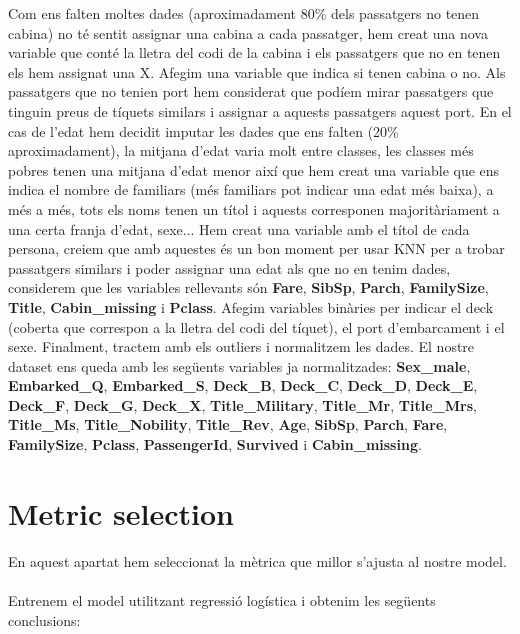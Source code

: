 \documentclass[9pt,a4paper,twoside]{tau-class/tau}
\begin{document}
Com ens falten moltes dades (aproximadament 80\% dels passatgers no tenen cabina) no té sentit assignar una cabina a cada passatger, hem creat una nova variable que conté la lletra del codi de la cabina i els passatgers que no en tenen els hem assignat una X. Afegim una variable que indica si tenen cabina o no.
Als passatgers que no tenien port hem considerat que podíem mirar passatgers que tinguin preus de tíquets similars i assignar a aquests passatgers aquest port.
En el cas de l'edat hem decidit imputar les dades que ens falten (20\% aproximadament), la mitjana d'edat varia molt entre classes, les classes més pobres tenen una mitjana d'edat menor així que hem creat una variable que ens indica el nombre de familiars (més familiars pot indicar una edat més baixa), a més a més, tots els noms tenen un títol i aquests corresponen majoritàriament a una certa franja d'edat, sexe...
Hem creat una variable amb el títol de cada persona, creiem que amb aquestes és un bon moment per usar KNN per a trobar passatgers similars i poder assignar una edat als que no en tenim dades, considerem que les variables rellevants són \textbf{Fare}, \textbf{SibSp}, \textbf{Parch}, \textbf{FamilySize}, \textbf{Title}, \textbf{Cabin\_missing} i  \textbf{Pclass}.
Afegim variables binàries per indicar el deck (coberta que correspon a la lletra del codi del tíquet), el port d'embarcament i el sexe.
Finalment, tractem amb els outliers i normalitzem les dades.
El nostre dataset ens queda amb les següents variables ja normalitzades: \textbf{Sex\_male}, \textbf{Embarked\_Q}, \textbf{Embarked\_S}, \textbf{Deck\_B}, \textbf{Deck\_C}, \textbf{Deck\_D},
\textbf{Deck\_E}, \textbf{Deck\_F}, \textbf{Deck\_G}, \textbf{Deck\_X}, \textbf{Title\_Military}, \textbf{Title\_Mr},
\textbf{Title\_Mrs}, \textbf{Title\_Ms}, \textbf{Title\_Nobility}, \textbf{Title\_Rev}, \textbf{Age}, \textbf{SibSp},
\textbf{Parch}, \textbf{Fare}, \textbf{FamilySize}, \textbf{Pclass}, \textbf{PassengerId}, \textbf{Survived} i
\textbf{Cabin\_missing}.

\section{Metric selection}

En aquest apartat hem seleccionat la mètrica que millor s'ajusta al nostre model.
\\\\
Entrenem el model utilitzant regressió logística i obtenim les següents conclusions:
\end{document}
